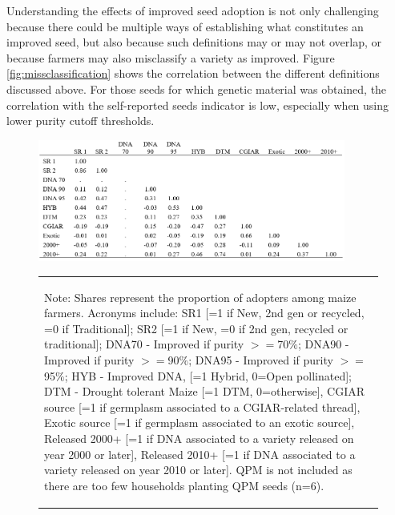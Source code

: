 \documentclass[11pt]{article}
\begin{document}
Understanding the effects of improved seed adoption is not only challenging because there could be multiple ways of establishing what constitutes an improved seed, but also because such definitions may or may not overlap, or because farmers may also misclassify a variety as improved. Figure \ref{fig:missclassification} shows the correlation between the different definitions discussed above. For those seeds for which genetic material was obtained, the correlation with the self-reported seeds indicator is low, especially when using lower purity cutoff thresholds. 

\begin{figure}[htpb]
    \centering
    \caption{Correlation of different definitions of improved seeds, 4th round}\label{fig:missclassification}
    \includegraphics[width = 0.9\textwidth]{results/figures/missclassification.png}
    \vspace*{-2em}
    \begin{table}[H]
        \centering
        \begin{tabular}{p{}} 
            \begin{tablenotes}
                  \small
                  \item Note: Shares represent the proportion of adopters among maize farmers. Acronyms include: SR1 [=1 if New, 2nd gen or recycled, =0 if Traditional]; SR2  [=1 if New, =0 if 2nd gen, recycled or traditional]; DNA70 - Improved if purity $>=$70$\%$; DNA90 - Improved if purity $>=$90$\%$; DNA95 - Improved if purity $>=$95$\%$; HYB - Improved DNA, [=1 Hybrid, 0=Open pollinated]; DTM - Drought tolerant Maize [=1 DTM, 0=otherwise], CGIAR source [=1 if germplasm associated to a CGIAR-related thread], Exotic source [=1 if germplasm associated to an exotic source], Released 2000+ [=1 if DNA associated to a variety released on year 2000 or later], Released 2010+ [=1 if DNA associated to a variety released on year 2010 or later]. QPM is not included as there are too few households planting QPM seeds (n=6).
            \end{tablenotes}
        \end{tabular}
    \end{table}       
    
\end{figure}
\end{document}
